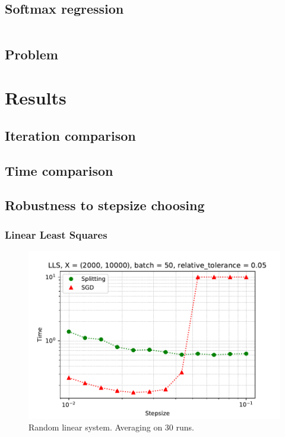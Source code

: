 \documentclass{article}
\begin{document}
\subsection{Softmax regression}
\begin{equation*}
\end{equation*}
\subsection{Problem}


\section{Results}
\subsection{Iteration comparison}
\subsection{Time comparison}
\subsection{Robustness to stepsize choosing}

\subsubsection{Linear Least Squares}

\begin{figure}[ht]
\vskip 0.2in
\begin{center}
\centerline{\includegraphics[width=\columnwidth]{sgd_split_iterations_lls.pdf}}
\caption{Random linear system. Averaging on 30 runs.}
\label{strang:fig:lls_step_iter}
\end{center}
\vskip -0.2in
\end{figure}
\end{document}
